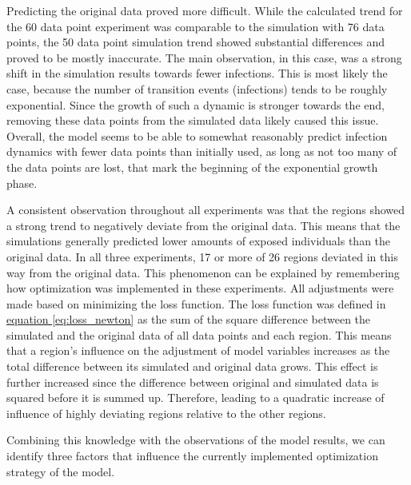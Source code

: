 
Predicting the original data proved more difficult. While the calculated trend for the 60 data point experiment was comparable
to the simulation with 76 data points, the 50 data point simulation trend showed substantial differences and proved to be mostly inaccurate.
The main observation, in this case, was a strong shift in the simulation results towards fewer infections.
This is most likely the case, because the number of transition events (infections) tends to be roughly exponential.
Since the growth of such a dynamic is stronger towards the end, removing these data points from the simulated data likely
caused this issue. Overall, the model seems to be able to somewhat reasonably predict infection dynamics with fewer data points than
initially used, as long as not too many of the data points are lost, that mark the beginning of the exponential growth phase.\newline

A consistent observation throughout all experiments was that the regions showed a strong trend to negatively deviate from the
original data. This means that the simulations generally predicted lower amounts of exposed individuals than the original
data. In all three experiments, 17 or more of 26 regions deviated in this way from the original data. This phenomenon can be explained
by remembering how optimization was implemented in these experiments.
All adjustments were made based on minimizing the loss function. The loss function was defined in
\hyperref[eq:loss_newton]{equation \ref*{eq:loss_newton}} as the sum of the square difference between the simulated and the original
data of all data points and each region. This means that a region's influence on the adjustment of model variables
increases as the total difference between its simulated and original data grows. This effect is further increased since the
difference between original and simulated data is squared before it is summed up. Therefore, leading to a quadratic increase of influence
of highly deviating regions relative to the other regions. \newline

Combining this knowledge with the observations of the model results, we can identify three factors that influence
the currently implemented optimization strategy of the model.\newline

